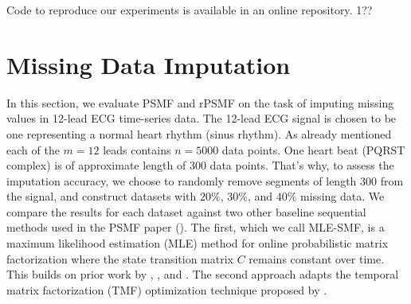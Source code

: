 \documentclass{mldsmsc}
\begin{document}
Code to reproduce our experiments is available in an online repository. 1??





\section{Missing Data Imputation}\label{sec:exp1}

In this section, we evaluate PSMF and rPSMF on the task of imputing missing values in 12-lead ECG time-series data. The 12-lead ECG signal is chosen to be one representing a normal heart rhythm (sinus rhythm). As already mentioned each of the $m = 12$ leads contains $n = 5000$ data points. One heart beat (PQRST complex) is of approximate length of $300$ data points. That's why, to assess the imputation accuracy, we choose to randomly remove segments of length $300$ from the signal, and construct datasets with $20\%$, $30\%$, and $40\%$ missing data. We compare the results for each dataset against two other baseline sequential methods used in the PSMF paper (\cite{akyildiz2021probabilistic}). The first, which we call MLE-SMF, is a maximum likelihood estimation (MLE) method for online probabilistic matrix factorization where the state transition matrix $C$ remains constant over time. This builds on prior work by \cite{YILDIRIM2012494}, \cite{6288274}, and \cite{6638240}. The second approach adapts the temporal matrix factorization (TMF) optimization technique proposed by \cite{NIPS2016_85422afb}. \newline
\end{document}

